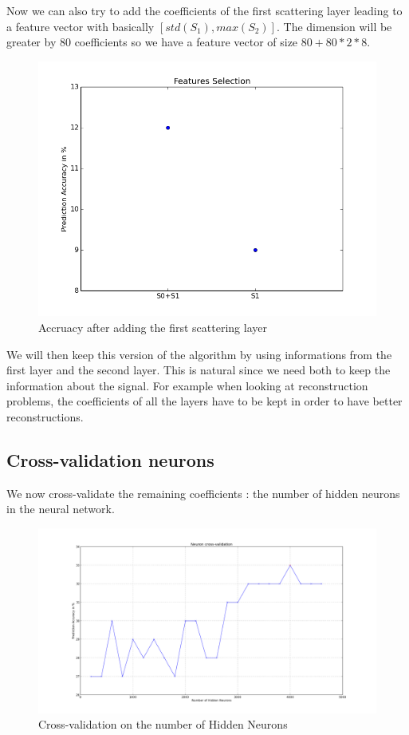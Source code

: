 \documentclass[a4paper]{report}
\begin{document}
Now we can also try to add the coefficients of the first scattering layer leading to a feature vector with basically $[std(S_1),max(S_2)]$. The dimension will be greater by $80$ coefficients so we have a feature vector of size $80+80*2*8$.
\begin{figure}[H]
\begin{center}
\includegraphics[scale=0.20]{S0_S1.png}\caption{Accruacy after adding the first scattering layer}\label{figure4}
\end{center}
\end{figure}
We will then keep this version of the algorithm by using informations from the first layer and the second layer. This is natural since we need both to keep the information about the signal. For example when looking at reconstruction problems, the coefficients of all the layers have to be kept in order to have better reconstructions.
\subsection{Cross-validation neurons}
We now cross-validate the remaining coefficients : the number of hidden neurons in the neural network.
\begin{figure}[H]
\begin{center}
\includegraphics[scale=0.20]{cross_neuron_S0_S1.png}\caption{Cross-validation on the number of Hidden Neurons}\label{figure4}
\end{center}
\end{figure}
\end{document}

